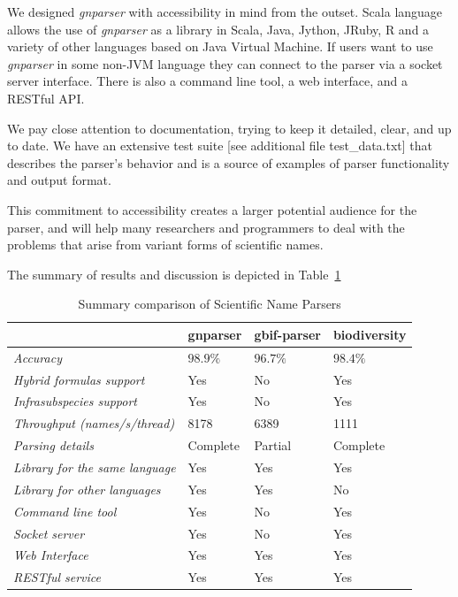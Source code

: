 \documentclass{bmcart}
\begin{document}
We designed \textit{gnparser} with accessibility in mind from the outset. Scala
language allows the use of \textit{gnparser} as a library in Scala, Java,
Jython, JRuby, R and a variety of other languages based on Java Virtual
Machine. If users want to use \textit{gnparser} in some non-JVM language
they can connect to the parser via a socket server interface. There is also a
command line tool, a web interface, and a RESTful API.

We pay close attention to documentation, trying to keep it detailed, clear, and
up to date. We have an extensive test suite [see additional file
test\_data.txt] that describes the parser's behavior and is a source of
examples of parser functionality and output format.

This commitment to accessibility creates a larger potential audience for the
parser, and will help many researchers and programmers to deal with the
problems that arise from variant forms of scientific names.

The summary of results and discussion is depicted in
Table~\ref{table:summary}

\begin{table}[htb]
  \begin{center}
    \caption{Summary comparison of Scientific Name Parsers}
    \label{table:summary}
    \resizebox{12.5cm}{!} {\begin{tabular}{|l|*{3}{l}|}
      \hline
                             & gnparser & gbif-parser & biodiversity \\
      \hline
      \textit{Accuracy}                     & $98.9\%$ & $96.7\%$ & $98.4\%$\\
      \textit{Hybrid formulas support}      & Yes      & No       & Yes     \\
      \textit{Infrasubspecies support}      & Yes      & No       & Yes     \\
      \textit{Throughput (names/s/thread)}  & 8178     & 6389     & 1111    \\
      \textit{Parsing details}              & Complete & Partial  & Complete\\
      \textit{Library for the same language}& Yes      & Yes      & Yes     \\
      \textit{Library for other languages}  & Yes      & Yes      & No      \\
      \textit{Command line tool}            & Yes      & No       & Yes     \\
      \textit{Socket server}                & Yes      & No       & Yes     \\
      \textit{Web Interface}                & Yes      & Yes      & Yes     \\
      \textit{RESTful service}              & Yes      & Yes      & Yes     \\
      \hline
    \end{tabular}
  }
  \end{center}
\end{table}
\end{document}
